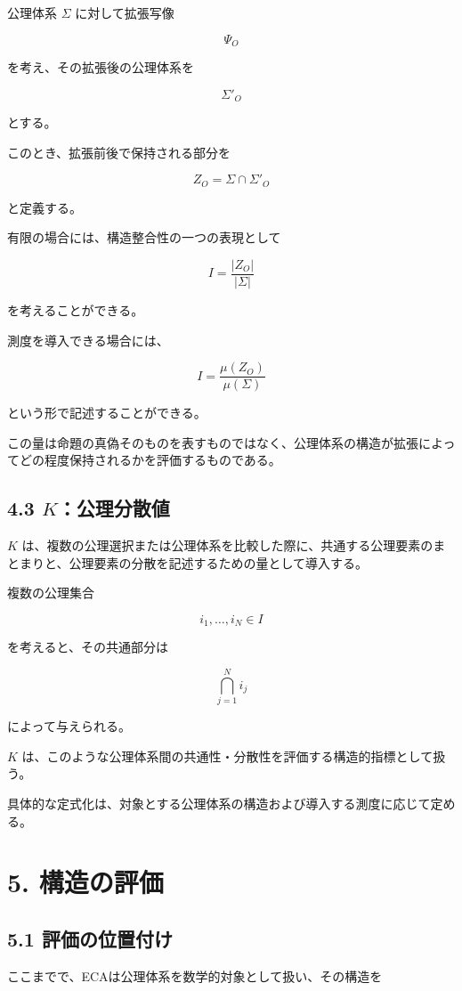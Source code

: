 \documentclass[12pt,a4paper]{article}
\begin{document}
公理体系 $\Sigma$ に対して拡張写像

\[
\Psi_O
\]

を考え、その拡張後の公理体系を

\[
\Sigma'_O
\]

とする。

このとき、拡張前後で保持される部分を

\[
Z_O=\Sigma\cap\Sigma'_O
\]

と定義する。

有限の場合には、構造整合性の一つの表現として

\[
I=\frac{|Z_O|}{|\Sigma|}
\]

を考えることができる。

測度を導入できる場合には、

\[
I=\frac{\mu(Z_O)}{\mu(\Sigma)}
\]

という形で記述することができる。

この量は命題の真偽そのものを表すものではなく、公理体系の構造が拡張によってどの程度保持されるかを評価するものである。

\subsection{4.3 $K$：公理分散値}

$K$ は、複数の公理選択または公理体系を比較した際に、共通する公理要素のまとまりと、公理要素の分散を記述するための量として導入する。

複数の公理集合

\[
i_1,\ldots,i_N\in I
\]

を考えると、その共通部分は

\[
\bigcap_{j=1}^{N}i_j
\]

によって与えられる。

$K$ は、このような公理体系間の共通性・分散性を評価する構造的指標として扱う。

具体的な定式化は、対象とする公理体系の構造および導入する測度に応じて定める。

\section{5. 構造の評価}

\subsection{5.1 評価の位置付け}

ここまでで、ECAは公理体系を数学的対象として扱い、その構造を
\end{document}
